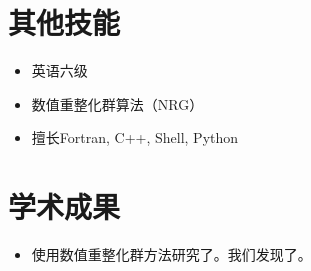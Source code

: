 \documentclass{resume}
\begin{document}
\section{其他技能}
\begin{itemize}[parsep=0.5ex]
\item 英语六级
\item 数值重整化群算法（NRG）
\item 擅长Fortran, C++, Shell, Python
\end{itemize}

\section{学术成果}
\begin{itemize}[parsep=0.5ex]
  \item 使用数值重整化群方法研究了。我们发现了。
\end{itemize}

%
%
\end{document}
